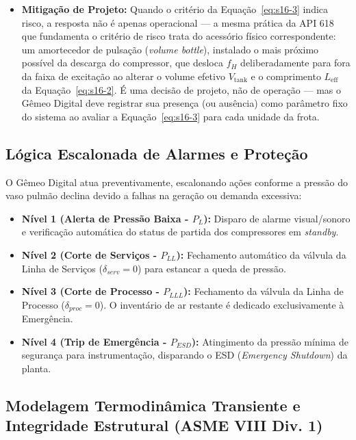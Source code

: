 \documentclass[12pt,a4paper]{article}
\numberwithin{equation}{section}
\numberwithin{table}{section}
\numberwithin{figure}{section}
\begin{document}
\begin{itemize}
	\item \textbf{Mitigação de Projeto:} Quando o critério da Equação~\eqref{eq:s16-3} indica risco, a resposta não é apenas operacional — a mesma prática da API 618 \cite{api618} que fundamenta o critério de risco trata do acessório físico correspondente: um amortecedor de pulsação (\textit{volume bottle}), instalado o mais próximo possível da descarga do compressor, que desloca $f_H$ deliberadamente para fora da faixa de excitação ao alterar o volume efetivo $V_{\text{tank}}$ e o comprimento $L_{\text{eff}}$ da Equação~\eqref{eq:s16-2}. É uma decisão de projeto, não de operação — mas o Gêmeo Digital deve registrar sua presença (ou ausência) como parâmetro fixo do sistema ao avaliar a Equação~\eqref{eq:s16-3} para cada unidade da frota.
\end{itemize}

\subsection{Lógica Escalonada de Alarmes e Proteção}

O Gêmeo Digital atua preventivamente, escalonando ações conforme a pressão do vaso pulmão declina devido a falhas na geração ou demanda excessiva:

\begin{itemize}
	\item \textbf{Nível 1 (Alerta de Pressão Baixa - $P_{L}$):} Disparo de alarme visual/sonoro e verificação automática do status de partida dos compressores em \textit{standby}.
	\item \textbf{Nível 2 (Corte de Serviços - $P_{LL}$):} Fechamento automático da válvula da Linha de Serviços ($\delta_{serv} = 0$) para estancar a queda de pressão.
	\item \textbf{Nível 3 (Corte de Processo - $P_{LLL}$):} Fechamento da válvula da Linha de Processo ($\delta_{proc} = 0$). O inventário de ar restante é dedicado exclusivamente à Emergência.
	\item \textbf{Nível 4 (Trip de Emergência - $P_{ESD}$):} Atingimento da pressão mínima de segurança para instrumentação, disparando o ESD (\textit{Emergency Shutdown}) da planta.
\end{itemize}

\subsection{Modelagem Termodinâmica Transiente e Integridade Estrutural (ASME VIII Div. 1)}
\end{document}
